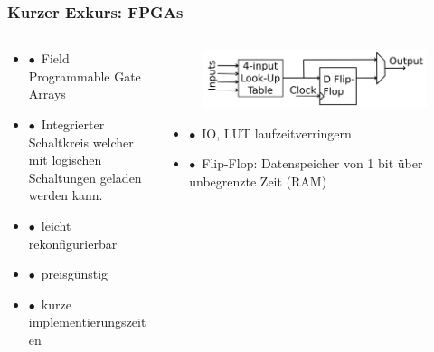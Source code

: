 \documentclass[aspectratio=1610, 12pt, xcolor=dvipsnames]{beamer}
\begin{document}
\begin{frame}\frametitle{Kurzer Exkurs: FPGAs}
  \begin{columns}
    \begin{column}[c]{0.48\textwidth}
      \begin{itemize}
        \item $\bullet$\, Field Programmable Gate Arrays
        \item $\bullet$\, Integrierter Schaltkreis welcher mit logischen Schaltungen geladen werden kann.
        \item $\bullet$\, leicht rekonfigurierbar
        \item $\bullet$\, preisgünstig
        \item $\bullet$\, kurze implementierungszeiten
      \end{itemize}
    \end{column}
    \begin{column}[c]{0.48\textwidth}
      \begin{figure}
        \centering
        \includegraphics[width=\textwidth]{plots/FPGA.png}
      \end{figure}
      \begin{itemize}
        \item $\bullet$\, IO, LUT \to laufzeitverringern
        \item $\bullet$\, Flip-Flop: Datenspeicher von 1 bit über unbegrenzte Zeit (RAM)
      \end{itemize}
    \end{column}
  \end{columns}
\end{frame}
\end{document}
